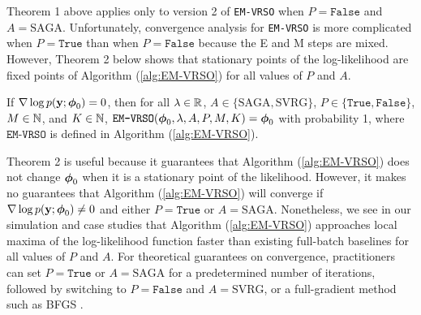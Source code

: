 

Theorem 1 above applies only to version 2 of \texttt{EM-VRSO} when $P = \texttt{False}$ and $A = \text{SAGA}$. Unfortunately, convergence analysis for \texttt{EM-VRSO} is more complicated when $P = \texttt{True}$ than when $P = \texttt{False}$ because the E and M steps are mixed. However, Theorem 2 below shows that stationary points of the log-likelihood are fixed points of Algorithm (\ref{alg:EM-VRSO}) for all values of $P$ and $A$.

\begin{theorem}
    If $\nabla \log p(\mathbf{y};\boldsymbol{\phi}_0) = 0$, then for all $\lambda \in \mathbb{R}$, $A \in \{\text{SAGA}, \text{SVRG}\}$, $P \in \{\texttt{True},\texttt{False}\}$, $M \in \mathbb{N}$, and $K \in \mathbb{N}$, $\texttt{EM-VRSO}(\boldsymbol{\phi}_0, \lambda, A, P, M, K) = \boldsymbol{\phi}_0$ with probability 1, where $\texttt{EM-VRSO}$ is defined in Algorithm (\ref{alg:EM-VRSO}).
\end{theorem}

Theorem 2 is useful because it guarantees that Algorithm (\ref{alg:EM-VRSO}) does not change $\boldsymbol{\phi}_0$ when it is a stationary point of the likelihood. However, it makes no guarantees that Algorithm (\ref{alg:EM-VRSO}) will converge if $\nabla \log p(\mathbf{y};\boldsymbol{\phi}_0) \neq 0$ and either $P = \texttt{True}$ or $A = \text{SAGA}$. Nonetheless, we see in our simulation and case studies that Algorithm (\ref{alg:EM-VRSO})  approaches local maxima of the log-likelihood function faster than existing full-batch baselines for all values of $P$ and $A$. For theoretical guarantees on convergence, practitioners can set $P = \texttt{True}$ or $A = \text{SAGA}$ for a predetermined number of iterations, followed by switching to $P = \texttt{False}$ and $A = \text{SVRG}$, or a full-gradient method such as BFGS \citep{Fletcher:2000}.


